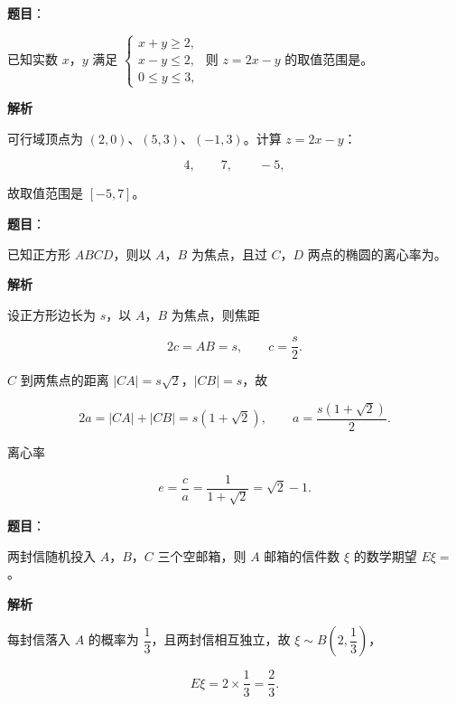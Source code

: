 \begin{answer}

\textbf{题目}：

已知实数 $x$，$y$ 满足 $\begin{cases}x+y\geqslant2,\\ x-y\leqslant2,\\ 0\leqslant y\leqslant3,\end{cases}$ 则 $z=2x-y$ 的取值范围是\gkblank{}。

\textbf{解析}

可行域顶点为 $(2,0)$、$(5,3)$、$(-1,3)$。计算 $z=2x-y$：

\nopagebreak[4]
\[4,\qquad 7,\qquad -5,\]

故取值范围是 $[-5,7]$。


\end{answer}
\begin{answer}

\textbf{题目}：

已知正方形 $ABCD$，则以 $A$，$B$ 为焦点，且过 $C$，$D$ 两点的椭圆的离心率为\gkblank{}。

\textbf{解析}

设正方形边长为 $s$，以 $A$，$B$ 为焦点，则焦距

\nopagebreak[4]
\[2c=AB=s,\qquad c=\frac s2.\]

$C$ 到两焦点的距离 $|CA|=s\sqrt2$，$|CB|=s$，故

\nopagebreak[4]
\[2a=|CA|+|CB|=s(1+\sqrt2),\qquad a=\frac{s(1+\sqrt2)}2.\]

离心率

\nopagebreak[4]
\[e=\frac ca=\frac1{1+\sqrt2}=\sqrt2-1.\]


\end{answer}
\begin{answer}

\textbf{题目}：

两封信随机投入 $A$，$B$，$C$ 三个空邮箱，则 $A$ 邮箱的信件数 $\xi$ 的数学期望 $E\xi=$\gkblank{}。

\textbf{解析}

每封信落入 $A$ 的概率为 $\dfrac13$，且两封信相互独立，故 $\xi\sim B\left(2,\dfrac13\right)$，

\nopagebreak[4]
\[E\xi=2\times\frac13=\frac23.\]


\end{answer}

